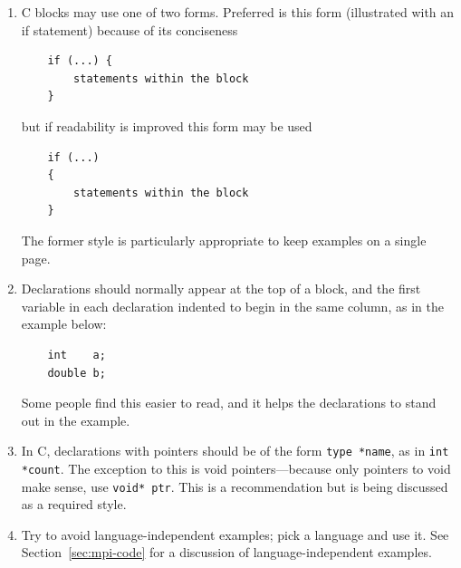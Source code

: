 \documentclass[letterpaper,twoside,11pt,fleqn]{article}
\begin{document}
\begin{enumerate}
\item C blocks may use one of two forms.  Preferred is this form
  (illustrated with an if statement) because of its conciseness
\begin{verbatim}
    if (...) {
        statements within the block
    }
\end{verbatim}
but if readability is improved this form may be used
\begin{verbatim}
    if (...)
    {
        statements within the block
    }
\end{verbatim}
The former style is particularly appropriate to keep examples on a
single page.
\item Declarations should normally appear at the top of a block, and
  the first variable in each declaration indented to begin in the same
  column, as in the example below:
\begin{verbatim}
    int    a;
    double b;
\end{verbatim}
Some people find this easier to read, and it helps the declarations to
stand out in the example.
\item In C, declarations with pointers should be of the form
  \verb+type *name+, as in \verb+int *count+.  The exception to this
  is void pointers---because only pointers to void make sense, use
  \verb+void* ptr+.
  This is a recommendation but is being discussed as a required style.
\item Try to avoid language-independent examples; pick a language and
  use it.
See Section~\ref{sec:mpi-code} for a discussion of
language-independent examples.



\end{enumerate}
\end{document}
